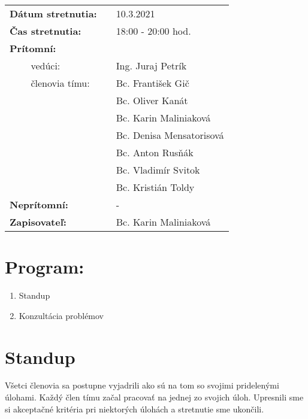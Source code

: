 \documentclass{article}
\begin{document}
    

    \begin{table}[h]
        \begin{tabular}{lllll}
            \multicolumn{3}{l}{\textbf{Dátum stretnutia:}} & & 10.3.2021 \\
            \multicolumn{3}{l}{\textbf{Čas stretnutia:}} & & 18:00 - 20:00 hod. \\
            \multicolumn{3}{l}{\textbf{Prítomní:}} \\
            & & vedúci: & & Ing. Juraj Petrík \\
            & & členovia tímu: & & Bc. František Gič  \\
            & & & & Bc. Oliver Kanát \\
            & & & & Bc. Karin Maliniaková \\
            & & & & Bc. Denisa Mensatorisová \\
            & & & & Bc. Anton Rusňák \\
            & & & & Bc. Vladimír Svitok \\
            & & & & Bc. Kristián Toldy \\
            \multicolumn{3}{l}{\textbf{Neprítomní:}} & & -\\
            \multicolumn{3}{l}{\textbf{Zapisovateľ:}} & & Bc. Karin Maliniaková \\
        \end{tabular}
        \label{tab:grades}
    \end{table}

    \section*{Program:}

    \begin{enumerate}
        \item Standup
        \item Konzultácia problémov
    \end{enumerate}

    \section*{Standup}

        \textnormal {Všetci členovia sa postupne vyjadrili ako sú na tom so svojimi pridelenými úlohami. Každý člen tímu začal pracovať na jednej zo svojich úloh.}
        \textnormal {Upresnili sme si akceptačné kritéria pri niektorých úlohách a stretnutie sme ukončili.}

    
\end{document}
